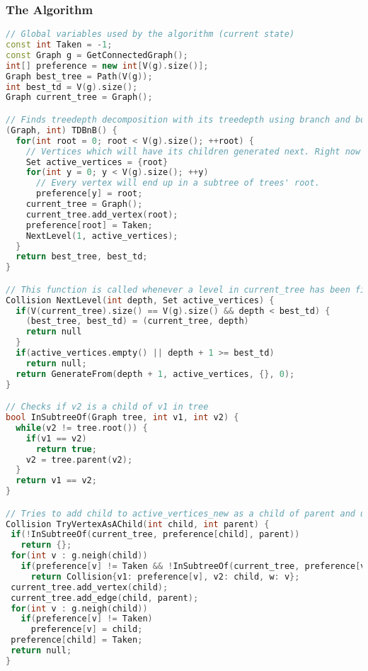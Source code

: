\subsubsection{The Algorithm}
\begin{lstlisting}[language=C++]
// Global variables used by the algorithm (current state)
const int Taken = -1;
const Graph g = GetConnectedGraph();
int[] preference = new int[V(g).size()];
Graph best_tree = Path(V(g));
int best_td = V(g).size();
Graph current_tree = Graph();

// Finds treedepth decomposition with its treedepth using branch and bound technique
(Graph, int) TDBnB() {
  for(int root = 0; root < V(g).size(); ++root) {
    // Vertices which will have its children generated next. Right now it's just root.
    Set active_vertices = {root}
    for(int y = 0; y < V(g).size(); ++y)
      // Every vertex will end up in a subtree of trees' root.
      preference[y] = root;
    current_tree = Graph();
    current_tree.add_vertex(root);
    preference[root] = Taken;
    NextLevel(1, active_vertices);
  }
  return best_tree, best_td;
}

// This function is called whenever a level in current_tree has been finished. active_vertices is a set of vertices which will have its children chosen next. Depth tells us how deep finished level is. It checks whether we have a chance improving previous results and starts generation of next level.
Collision NextLevel(int depth, Set active_vertices) {
  if(V(current_tree).size() == V(g).size() && depth < best_td) {
    (best_tree, best_td) = (current_tree, depth)
    return null
  }
  if(active_vertices.empty() || depth + 1 >= best_td)
    return null;
  return GenerateFrom(depth + 1, active_vertices, {}, 0);
}

// Checks if v2 is a child of v1 in tree
bool InSubtreeOf(Graph tree, int v1, int v2) {
  while(v2 != tree.root()) {
    if(v1 == v2)
      return true;
    v2 = tree.parent(v2);
  }
  return v1 == v2;
}

// Tries to add child to active_vertices_new as a child of parent and update both current_tree and history. When it contradics with treedepth decomposition definition, it returns an error and makes no changes to current state.
Collision TryVertexAsAChild(int child, int parent) {
 if(!InSubtreeOf(current_tree, preference[child], parent))
   return {};
 for(int v : g.neigh(child))
   if(preference[v] != Taken && !InSubtreeOf(current_tree, preference[v], parent))
     return Collision{v1: preference[v], v2: child, w: v};
 current_tree.add_vertex(child);
 current_tree.add_edge(child, parent);
 for(int v : g.neigh(child))
   if(preference[v] != Taken)
     preference[v] = child;
 preference[child] = Taken;
 return null;
}


\end{lstlisting}
